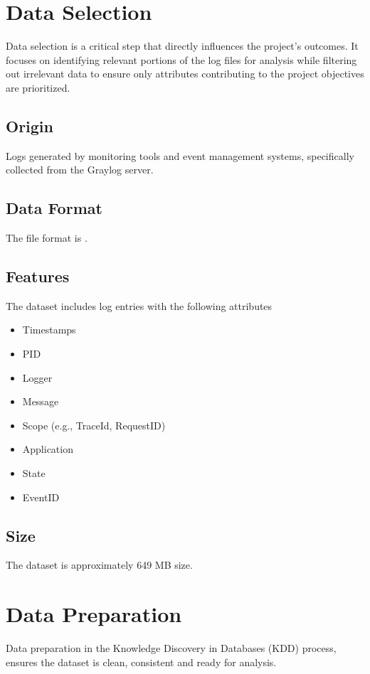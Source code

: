 \section{Data Selection}

Data selection is a critical step that directly influences the project’s outcomes. It focuses on identifying relevant portions of the log files for analysis while filtering out irrelevant data to ensure only attributes contributing to the project objectives are prioritized.

\subsection{Origin}
Logs generated by monitoring tools and event management systems, specifically collected from the Graylog server.

\subsection{Data Format}
The file format is .

\subsection{Features}
The dataset includes log entries with the following attributes
	\begin{itemize}
	\item Timestamps
	\item PID
	\item Logger
	\item Message
	\item Scope (e.g., TraceId, RequestID)
	\item Application
	\item State
	\item EventID
\end{itemize}

\subsection{Size}
The dataset is approximately 649 MB size.

\section{Data Preparation}
Data preparation in the Knowledge Discovery in Databases (KDD) process, ensures the dataset is clean, consistent and ready for analysis. 

